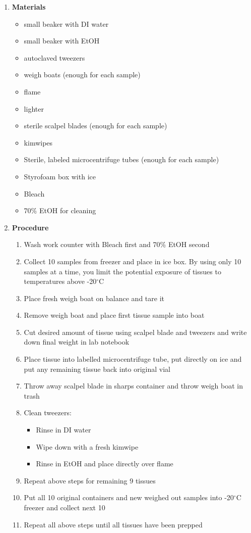 \documentclass[11pt, oneside]{article}
\begin{document}
		\begin{enumerate}
			\item {\bf Materials}
			\begin{itemize}
				\itemsep0em
				\item small beaker with DI water
				\item small beaker with EtOH
				\item autoclaved tweezers
				\item weigh boats (enough for each sample)
				\item flame 
				\item lighter
				\item sterile scalpel blades (enough for each sample)
				\item kimwipes
				\item Sterile, labeled microcentrifuge tubes (enough for each sample)
				\item Styrofoam box with ice
				\item Bleach 
				\item 70\% EtOH for cleaning
			\end{itemize}
			
			\item {\bf Procedure}
			\begin{enumerate}
				\item Wash work counter with Bleach first and 70\% EtOH second
				\item Collect 10 samples from freezer and place in ice box. By using only 10 samples at a time, you limit the potential exposure of tissues to temperatures above -20$^{\circ}$C
				\item Place fresh weigh boat on balance and tare it
				\item Remove weigh boat and place first tissue sample into boat
				\item Cut desired amount of tissue using scalpel blade and tweezers and write down final weight in lab notebook
				\item Place tissue into labelled microcentrifuge tube, put directly on ice and put any remaining tissue back into original vial
				\item Throw away scalpel blade in sharps container and throw weigh boat in trash
				\item Clean tweezers:
				\begin{itemize}
					\item Rinse in DI water
					\item Wipe down with a fresh kimwipe
					\item Rinse in EtOH and place directly over flame
				\end{itemize}
				\item Repeat above steps for remaining 9 tissues
				\item Put all 10 original containers and new weighed out samples into -20$^{\circ}$C freezer and collect next 10
				\item Repeat all above steps until all tissues have been prepped
			\end{enumerate}
		\end{enumerate}
			
\end{document}
